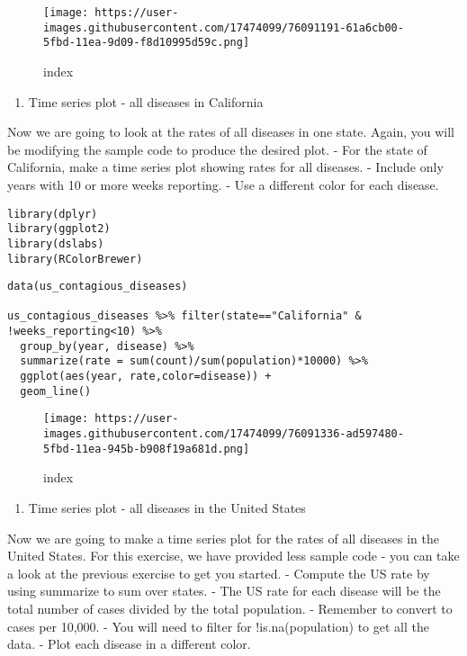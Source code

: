 \documentclass[]{article}
\providecommand{\tightlist}{%
  \setlength{\itemsep}{0pt}\setlength{\parskip}{0pt}}
\begin{document}
\begin{figure}
\centering
\texttt{[image: https://user-images.githubusercontent.com/17474099/76091191-61a6cb00-5fbd-11ea-9d09-f8d10995d59c.png]}
\caption{index}
\end{figure}

\begin{enumerate}
\def\labelenumi{\arabic{enumi}.}
\setcounter{enumi}{2}
\tightlist
\item
  Time series plot - all diseases in California
\end{enumerate}

Now we are going to look at the rates of all diseases in one state.
Again, you will be modifying the sample code to produce the desired
plot. - For the state of California, make a time series plot showing
rates for all diseases. - Include only years with 10 or more weeks
reporting. - Use a different color for each disease.

\begin{verbatim}
library(dplyr)
library(ggplot2)
library(dslabs)
library(RColorBrewer)
\end{verbatim}

\begin{verbatim}
data(us_contagious_diseases)

us_contagious_diseases %>% filter(state=="California" & !weeks_reporting<10) %>% 
  group_by(year, disease) %>%
  summarize(rate = sum(count)/sum(population)*10000) %>%
  ggplot(aes(year, rate,color=disease)) + 
  geom_line()
\end{verbatim}

\begin{figure}
\centering
\texttt{[image: https://user-images.githubusercontent.com/17474099/76091336-ad597480-5fbd-11ea-945b-b908f19a681d.png]}
\caption{index}
\end{figure}

\begin{enumerate}
\def\labelenumi{\arabic{enumi}.}
\setcounter{enumi}{3}
\tightlist
\item
  Time series plot - all diseases in the United States
\end{enumerate}

Now we are going to make a time series plot for the rates of all
diseases in the United States. For this exercise, we have provided less
sample code - you can take a look at the previous exercise to get you
started. - Compute the US rate by using summarize to sum over states. -
The US rate for each disease will be the total number of cases divided
by the total population. - Remember to convert to cases per 10,000. -
You will need to filter for !is.na(population) to get all the data. -
Plot each disease in a different color.
\end{document}
